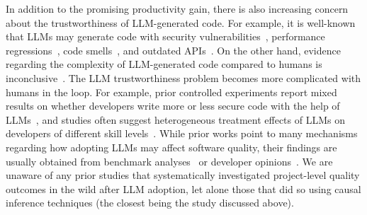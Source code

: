 In addition to the promising productivity gain, there is also increasing concern about the trustworthiness of LLM-generated code.
For example, it is well-known that LLMs may generate code with security vulnerabilities~\cite{DBLP:conf/sp/PearceA0DK22, DBLP:conf/smc/KhouryABC23,  DBLP:journals/corr/abs-2310-02059, DBLP:conf/csr2/AmbatiRBS24, DBLP:journals/tse/LiuTLZZ24}, performance regressions~\cite{DBLP:conf/issre/LiC0X0S24}, code smells~\cite{DBLP:conf/scam/SiddiqMMJS22}, and outdated APIs~\cite{DBLP:journals/corr/abs-2502-01853, wang2025llms}.
On the other hand, evidence regarding the complexity of LLM-generated code compared to humans is inconclusive~\cite{DBLP:conf/msr/NguyenN22, DBLP:journals/corr/abs-2409-19182, martinovic2024impact}.
The LLM trustworthiness problem becomes more complicated with humans in the loop.
For example, prior controlled experiments report mixed results on whether developers write more or less secure code with the help of LLMs~\cite{DBLP:conf/ccs/PerryS0B23, DBLP:conf/sp/OhLPKK24, DBLP:conf/uss/SandovalPNKGD23}, and studies often suggest heterogeneous treatment effects of LLMs on developers of different skill levels~\cite{DBLP:journals/jss/DakhelMNKDJ23, DBLP:journals/corr/abs-2302-06590, DBLP:journals/corr/abs-2410-02091, cui2025effects}.
While prior works point to many mechanisms regarding how adopting LLMs may affect software quality, their findings are usually obtained from benchmark analyses~\cite[e.g.,][]{DBLP:conf/sp/PearceA0DK22} or developer opinions~\cite[e.g.,][]{martinovic2024impact}.
We are unaware of any prior studies that systematically investigated project-level quality outcomes in the wild after LLM adoption, let alone those that did so using causal inference techniques (the closest being the \citet{DBLP:conf/icis/YeverechyahuMO24} study discussed above).

